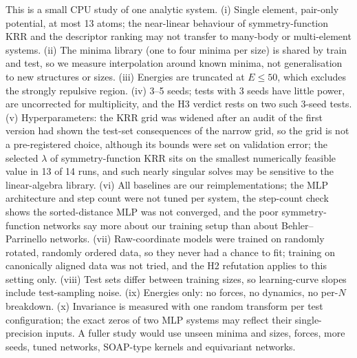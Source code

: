 This is a small CPU study of one analytic system. (i) Single element, pair-only potential, at most 13 atoms; the near-linear behaviour of symmetry-function KRR and the descriptor ranking may not transfer to many-body or multi-element systems. (ii) The minima library (one to four minima per size) is shared by train and test, so we measure interpolation around known minima, not generalisation to new structures or sizes. (iii) Energies are truncated at $E\le50$, which excludes the strongly repulsive region. (iv) 3--5 seeds; tests with 3 seeds have little power, are uncorrected for multiplicity, and the H3 verdict rests on two such 3-seed tests. (v) Hyperparameters: the KRR grid was widened after an audit of the first version had shown the test-set consequences of the narrow grid, so the grid is not a pre-registered choice, although its bounds were set on validation error; the selected $\lambda$ of symmetry-function KRR sits on the smallest numerically feasible value in 13 of 14 runs, and such nearly singular solves may be sensitive to the linear-algebra library. (vi) All baselines are our reimplementations; the MLP architecture and step count were not tuned per system, the step-count check shows the sorted-distance MLP was not converged, and the poor symmetry-function networks say more about our training setup than about Behler--Parrinello networks. (vii) Raw-coordinate models were trained on randomly rotated, randomly ordered data, so they never had a chance to fit; training on canonically aligned data was not tried, and the H2 refutation applies to this setting only. (viii) Test sets differ between training sizes, so learning-curve slopes include test-sampling noise. (ix) Energies only: no forces, no dynamics, no per-$N$ breakdown. (x) Invariance is measured with one random transform per test configuration; the exact zeros of two MLP systems may reflect their single-precision inputs. A fuller study would use unseen minima and sizes, forces, more seeds, tuned networks, SOAP-type kernels and equivariant networks.

